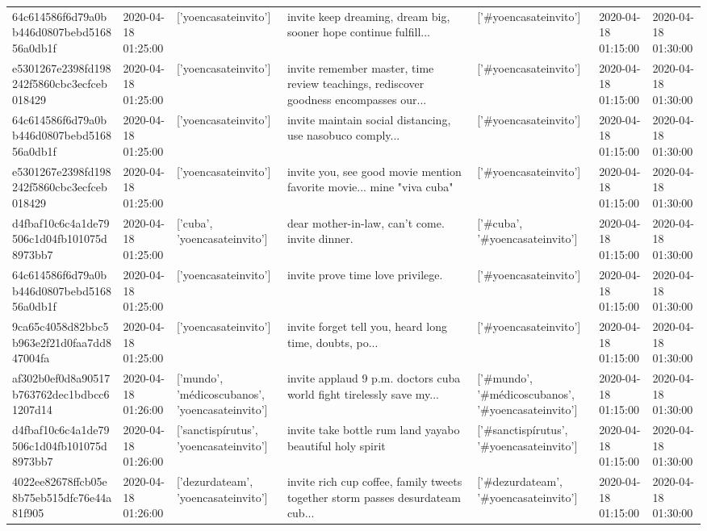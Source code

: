 \begin{tabular}{lllllll}
64c614586f6d79a0bb446d0807bebd516856a0db1f & 2020-04-18 01:25:00 & ['yoencasateinvito'] & invite keep dreaming, dream big, sooner hope continue fulfill... & ['#yoencasateinvito'] & 2020-04-18 01:15:00 & 2020-04-18 01:30:00 \\
e5301267e2398fd198242f5860cbc3ecfceb018429 & 2020-04-18 01:25:00 & ['yoencasateinvito'] & invite remember master, time review teachings, rediscover goodness encompasses our... & ['#yoencasateinvito'] & 2020-04-18 01:15:00 & 2020-04-18 01:30:00 \\
64c614586f6d79a0bb446d0807bebd516856a0db1f & 2020-04-18 01:25:00 & ['yoencasateinvito'] & invite maintain social distancing, use nasobuco comply... & ['#yoencasateinvito'] & 2020-04-18 01:15:00 & 2020-04-18 01:30:00 \\
e5301267e2398fd198242f5860cbc3ecfceb018429 & 2020-04-18 01:25:00 & ['yoencasateinvito'] & invite you, see good movie mention favorite movie... mine "viva cuba" & ['#yoencasateinvito'] & 2020-04-18 01:15:00 & 2020-04-18 01:30:00 \\
d4fbaf10c6c4a1de79506c1d04fb101075d8973bb7 & 2020-04-18 01:25:00 & ['cuba', 'yoencasateinvito'] & dear mother-in-law, can't come. invite dinner. & ['#cuba', '#yoencasateinvito'] & 2020-04-18 01:15:00 & 2020-04-18 01:30:00 \\
64c614586f6d79a0bb446d0807bebd516856a0db1f & 2020-04-18 01:25:00 & ['yoencasateinvito'] & invite prove time love privilege. & ['#yoencasateinvito'] & 2020-04-18 01:15:00 & 2020-04-18 01:30:00 \\
9ca65c4058d82bbc5b963e2f21d0faa7dd847004fa & 2020-04-18 01:25:00 & ['yoencasateinvito'] & invite forget tell you, heard long time, doubts, po... & ['#yoencasateinvito'] & 2020-04-18 01:15:00 & 2020-04-18 01:30:00 \\
af302b0ef0d8a90517b763762dec1bdbcc61207d14 & 2020-04-18 01:26:00 & ['mundo', 'médicoscubanos', 'yoencasateinvito'] & invite applaud 9 p.m. doctors cuba world fight tirelessly save my... & ['#mundo', '#médicoscubanos', '#yoencasateinvito'] & 2020-04-18 01:15:00 & 2020-04-18 01:30:00 \\
d4fbaf10c6c4a1de79506c1d04fb101075d8973bb7 & 2020-04-18 01:26:00 & ['sanctispírutus', 'yoencasateinvito'] & invite take bottle rum land yayabo beautiful holy spirit & ['#sanctispírutus', '#yoencasateinvito'] & 2020-04-18 01:15:00 & 2020-04-18 01:30:00 \\
4022ee82678ffcb05e8b75eb515dfc76e44a81f905 & 2020-04-18 01:26:00 & ['dezurdateam', 'yoencasateinvito'] & invite rich cup coffee, family tweets together storm passes desurdateam cub... & ['#dezurdateam', '#yoencasateinvito'] & 2020-04-18 01:15:00 & 2020-04-18 01:30:00 \\

\end{tabular}
